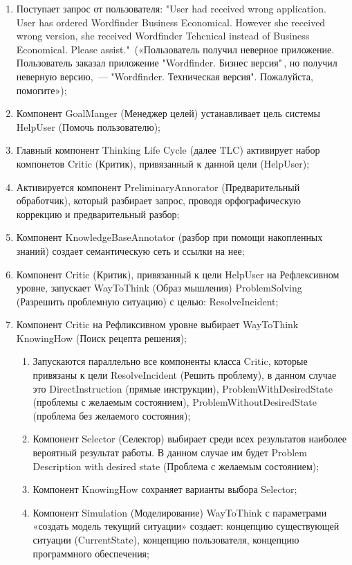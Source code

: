 \begin{enumerate}
	\item Поступает запрос от пользователя: 
	"User had received wrong application. User has ordered Wordfinder Business Economical. However she received wrong version, she received Wordfinder Tehcnical instead of Business Economical. Please assist."\ («Пользователь получил неверное приложение. Пользователь заказал приложение "Wordfinder. Бизнес версия"\,, но получил неверную версию,~--- "Wordfinder. Техническая версия". Пожалуйста, помогите»);
	\item Компонент GoalManger (Менеджер целей) устанавливает цель системы HelpUser (Помочь пользователю);
	\item Главный компонент Thinking Life Cycle (далее TLC) активирует набор компонетов Critic (Критик), привязанный к данной цели (HelpUser); 
	\item Активируется компонент PreliminaryAnnorator (Предварительный обработчик), который разбирает запрос, проводя орфографическую коррекцию и предварительный разбор;
	\item Компонент KnowledgeBaseAnnotator (разбор при помощи накопленных знаний) создает семантическую сеть и ссылки на нее;
	\item Компонент Critic (Критик), привязанный к цели HelpUser на Рефлексивном уровне, запускает WayToThink (Образ мышления) ProblemSolving (Разрешить проблемную ситуацию) с целью: ResolveIncident;
	\item Компонент Critic на Рефликсивном уровне выбирает WayToThink KnowingHow (Поиск рецепта решения);
	\begin{enumerate}
	\item Запускаются параллельно все компоненты класса Critic, которые привязаны к цели ResolveIncident (Решить проблему), в данном случае это DirectInstruction (прямые инструкции), ProblemWithDesiredState (проблемы с желаемым состоянием), ProblemWithoutDesiredState (проблема без желаемого состояния);
	\item Компонент Selector (Селектор) выбирает среди всех результатов наиболее вероятный результат работы. В данном случае им будет Problem Description with desired state (Проблема с желаемым состоянием);
	\item Компонент KnowingHow сохраняет варианты выбора Selector;
	\item Компонент Simulation (Моделирование) WayToThink с параметрами «создать модель текущий ситуации» создает: концепцию существующей ситуации (CurrentState), концепцию пользователя, концепцию программного обеспечения;

\end{enumerate}
\end{enumerate}
